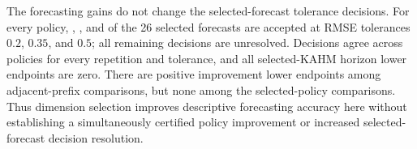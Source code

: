 The forecasting gains do not change the selected-forecast tolerance decisions.
For every policy, \DimAcceptLow{}, \DimAcceptMedium{}, and \DimAcceptHigh{}
of the 26 selected forecasts are accepted at RMSE tolerances $0.2$, $0.35$,
and $0.5$; all remaining decisions are unresolved. Decisions agree across
policies for every repetition and tolerance, and all
\DimSelectedLowerZero{} selected-KAHM horizon lower endpoints are zero.
There are \DimPositivePrefix{} positive improvement lower endpoints among
\DimPrefixTails{} adjacent-prefix comparisons, but none among the
\DimPolicyTails{} selected-policy comparisons. Thus dimension selection
improves descriptive forecasting accuracy here without establishing a
simultaneously certified policy improvement or increased selected-forecast
decision resolution.
